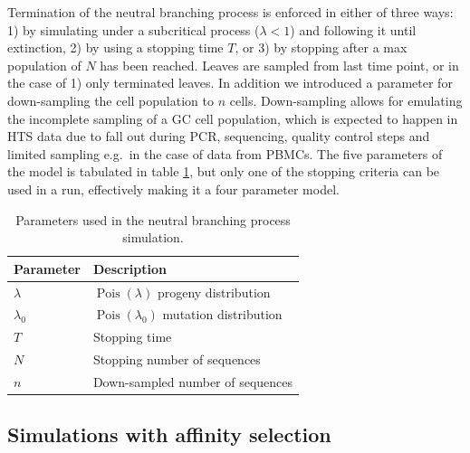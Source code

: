 Termination of the neutral branching process is enforced in either of three ways: 1) by simulating under a subcritical process ($\lambda < 1$) \cite{gwp} and following it until extinction, 2) by using a stopping time $T$, or 3) by stopping after a max population of $N$ has been reached.
Leaves are sampled from last time point, or in the case of 1) only terminated leaves.
In addition we introduced a parameter for down-sampling the cell population to $n$ cells.
Down-sampling allows for emulating the incomplete sampling of a GC cell population, which is expected to happen in HTS data due to fall out during PCR, sequencing, quality control steps and limited sampling e.g.\ in the case of data from PBMCs.
The five parameters of the model is tabulated in table \ref{neut_constants}, but only one of the stopping criteria can be used in a run, effectively making it a four parameter model.

\begin{table}[ht]
\centering
\begin{tabular}{ll}
Parameter    & Description \\ \hline
$\lambda$ & $\operatorname{Pois}(\lambda)$ progeny distribution \\
$\lambda_0$ & $\operatorname{Pois}(\lambda_0)$ mutation distribution \\
$T$ & Stopping time \\
$N$ & Stopping number of sequences \\
$n$ & Down-sampled number of sequences
\end{tabular}
\caption{
\label{neut_constants}
    Parameters used in the neutral branching process simulation.}
\end{table}






\subsection{Simulations with affinity selection}


